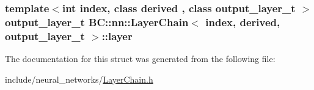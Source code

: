 \subsubsection[{\texorpdfstring{layer}{layer}}]{\setlength{\rightskip}{0pt plus 5cm}template$<$int index, class derived , class output\+\_\+layer\+\_\+t $>$ output\+\_\+layer\+\_\+t {\bf B\+C\+::nn\+::\+Layer\+Chain}$<$ index, derived, output\+\_\+layer\+\_\+t $>$\+::layer}\hypertarget{structBC_1_1nn_1_1LayerChain_3_01index_00_01derived_00_01output__layer__t_01_4_a090c4320f0cd55d0c75f41c948497bde}{}\label{structBC_1_1nn_1_1LayerChain_3_01index_00_01derived_00_01output__layer__t_01_4_a090c4320f0cd55d0c75f41c948497bde}


The documentation for this struct was generated from the following file\+:\begin{DoxyCompactItemize}
\item 
include/neural\+\_\+networks/\hyperlink{LayerChain_8h}{Layer\+Chain.\+h}\end{DoxyCompactItemize}
